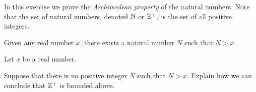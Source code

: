 \begin{comment}

\ExerciseSolution

\ba

\item Consider the function $h$ defined by $h(x) = |f(x)-g(x)| = |x^2-2x+1| = |(x-1)^2|$ on $[0,1]$. The function $h$ has a maximum value of $1$ at the input of $x=0$ on $[0,1]$. So $d(x^2,1-2x) = 1$. 

\item Let $a$ and $b$ be real numbers with $a < b$. Let $f, g \in C([a,b])$. By definition we have $d(f,g) \geq 0$. Also
\[d(f,g) = \sup_{x \in [a,b]}\{|f(x)-g(x)|\} = \sup_{x \in [a,b]}\{|g(x)-f(x)|\} = d(g,f).\]

If $f=g$, then $f(x) = g(x)$ for all $x \in [a,b]$. As a result, $d(f,g) = \sup_{x \in [a,b]}\{|f(x)-g(x)|\} = \sup\{0\} = 0$. Conversely, suppose that $d(f,g) = 0$. Then $\sup_{x \in [a,b]}\{|f(x)-g(x)|\} = 0$ which implies that $|f(x) - g(x)| = 0$ for all $x \in [a,b]$. But this means that $f(x) = g(x)$ for all $x \in [a,b]$ and so $f = g$.

Finally, we address the triangle inequality. Let $h \in C[a,b]$. Then 
\begin{align*}
d(f,h) &= \sup_{x \in [a,b]}\{|f(x)-h(x)|\} \\
	&= \sup_{x \in [a,b]}\{|(f(x)-g(x)) + (g(x)-h(x))|\} \\
	&\leq \sup_{x \in [a,b]}  \{|(f(x)-g(x))|\} + \sup_{x \in [a,b]}  \{|(g(x)-h(x))|\} \\
	&= d(f,g) + d(g,h).
\end{align*}

\ea

\end{comment}

\item \label{ex:GLB_Archimedean} In this exercise we prove the \emph{Archimedean property} of the natural numbers. Note that the set of natural numbers, denoted $\mathbb{N}$ or $\mathbb{Z}^+$, is the set of all positive integers. 

\begin{theorem} Given any real number $x$, there exists a natural number $N$ such that $N > x$. 
\end{theorem}

Let $x$ be a real number. 
\ba
\item Suppose that there is no positive integer $N$ such that $N > x$. Explain how we can conclude that $\mathbb{Z}^+$ is bounded above. 

